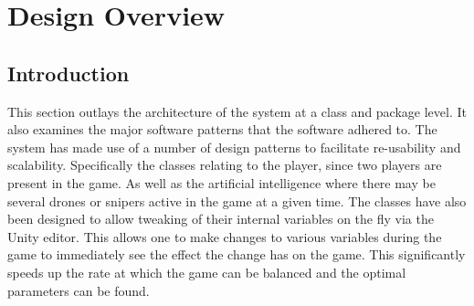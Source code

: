 \documentclass[11pt,a4paper]{article}
\begin{document}
\section{Design Overview}
\label{s:design-overview}
\subsection{Introduction}
This section outlays the architecture of the system at a class and package level. It also examines the major software patterns that the software adhered to. The system has made use of a number of design patterns to facilitate re-usability and scalability. Specifically the classes relating to the player, since two players are present in the game. As well as the artificial intelligence where there may be several drones or snipers active in the game at a given time. The classes have also been designed to allow tweaking of their internal variables on the fly via the Unity editor. This allows one to make changes to various variables during the game to immediately see the effect the change has on the game. This significantly speeds up the rate at which the game can be balanced and the optimal parameters can be found.
\end{document}
